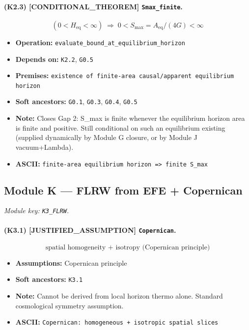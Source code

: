 \documentclass[11pt,a4paper]{article}
\theoremstyle{remark}\newtheorem*{caution}{Caution}
\newcommand{\tagbox}[1]{\textsc{[#1]}}
\begin{document}
\paragraph{(K2.3) \tagbox{CONDITIONAL\_THEOREM} \texttt{Smax\_finite}.}
\begin{equation}
(0<H_{\mathrm{eq}}<\infty)\;\Rightarrow\;0<S_{\max}=A_{\mathrm{eq}}/(4G)<\infty
\tag{K2.3}
\end{equation}
\begin{itemize}\setlength{\itemsep}{0.12em}
\item \textbf{Operation:} \texttt{evaluate\_bound\_at\_equilibrium\_horizon}
\item \textbf{Depends on:} \texttt{K2.2}, \texttt{G0.5}
\item \textbf{Premises:} \texttt{existence of finite-area causal/apparent equilibrium horizon}
\item \textbf{Soft ancestors:} \texttt{G0.1}, \texttt{G0.3}, \texttt{G0.4}, \texttt{G0.5}
\item \textbf{Note:} Closes Gap 2: S\_max is finite whenever the equilibrium horizon area is finite and positive. Still conditional on such an equilibrium existing (supplied dynamically by Module G closure, or by Module J vacuum+Lambda).
\item \textbf{ASCII:} \texttt{finite-area equilibrium horizon => finite S\_max}
\end{itemize}
\subsection{Module K --- FLRW from EFE + Copernican}
\textit{Module key: \texttt{K3\_FLRW}.}
\paragraph{(K3.1) \tagbox{JUSTIFIED\_ASSUMPTION} \texttt{Copernican}.}
\begin{equation}
\text{spatial homogeneity + isotropy (Copernican principle)}
\tag{K3.1}
\end{equation}
\begin{itemize}\setlength{\itemsep}{0.12em}
\item \textbf{Assumptions:} Copernican principle
\item \textbf{Soft ancestors:} \texttt{K3.1}
\item \textbf{Note:} Cannot be derived from local horizon thermo alone. Standard cosmological symmetry assumption.
\item \textbf{ASCII:} \texttt{Copernican: homogeneous + isotropic spatial slices}
\end{itemize}
\end{document}

